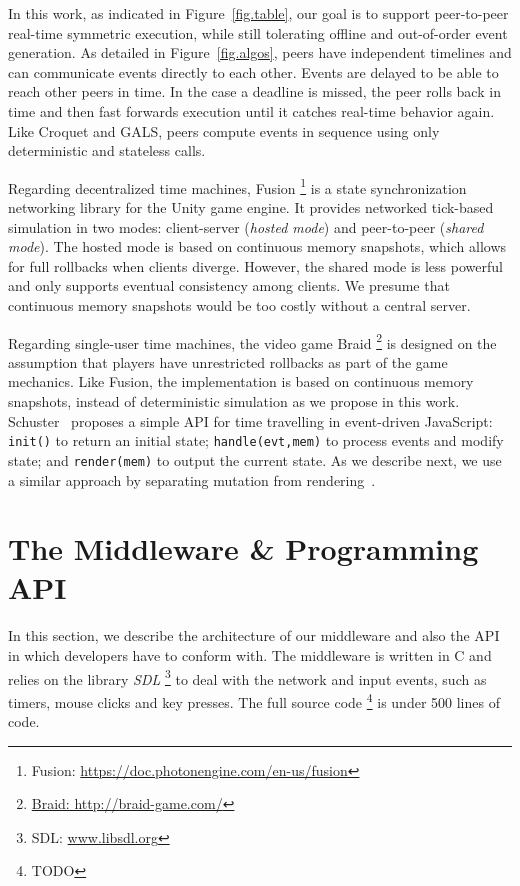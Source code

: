 \documentclass[10pt,journal,compsoc]{IEEEtran}
\newcommand{\code}[1]  {\texttt{\footnotesize{#1}}}
\begin{document}
In this work, as indicated in Figure~\ref{fig.table}, our goal is to support
peer-to-peer real-time symmetric execution, while still tolerating offline and
out-of-order event generation.
%
As detailed in Figure~\ref{fig.algos}, peers have independent timelines and
can communicate events directly to each other.
Events are delayed to be able to reach other peers in time.
In the case a deadline is missed, the peer rolls back in time and then fast
forwards execution until it catches real-time behavior again.
%
Like Croquet and GALS, peers compute events in sequence using only
deterministic and stateless calls.

Regarding decentralized time machines, Fusion%
\footnote{Fusion: \url{https://doc.photonengine.com/en-us/fusion}}
is a state synchronization networking library for the Unity game engine.
It provides networked tick-based simulation in two modes: client-server
(\emph{hosted mode}) and peer-to-peer (\emph{shared mode}).
The hosted mode is based on continuous memory snapshots, which allows for
full rollbacks when clients diverge.
However, the shared mode is less powerful and only supports eventual
consistency among clients.
We presume that continuous memory snapshots would be too costly without a
central server.

Regarding single-user time machines, the video game Braid%
\footnote{\url{Braid: http://braid-game.com/}}
is designed on the assumption that players have unrestricted rollbacks as part
of the game mechanics.
Like Fusion, the implementation is based on continuous memory snapshots,
instead of deterministic simulation as we propose in this work.
%
Schuster~\cite{tml.js} proposes a simple API for time travelling in
event-driven JavaScript:
    \code{init()} to return an initial state;
    \code{handle(evt,mem)} to process events and modify state; and
    \code{render(mem)} to output the current state.
As we describe next, we use a similar approach by separating mutation from
rendering~\cite{tml.alive}.

\section{The Middleware \& Programming API}
\label{sec.tml}

In this section, we describe the architecture of our middleware and also the
API in which developers have to conform with.
The middleware is written in C and relies on the library \emph{SDL}%
\footnote{SDL: \url{www.libsdl.org}}
to deal with the network and input events, such as timers, mouse clicks and
key presses.
The full source code%
\footnote{TODO}
is under 500 lines of code.
\end{document}
